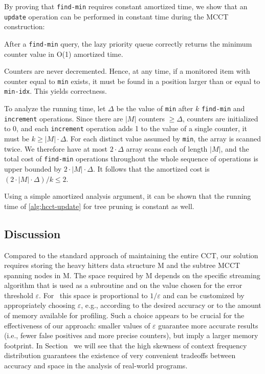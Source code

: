 \ifauthorea{\newline}{}
\noindent By proving that {\tt find-min} requires constant amortized time, we show that an {\tt update} operation can be performed in constant time during the MCCT construction:
\begin{theorem}
After a {\tt find-min} query, the lazy priority queue correctly returns the minimum counter value in O(1) amortized time.
\end{theorem}
\begin{myproof} Counters are never decremented. Hence, at any time, if a monitored item with counter equal to {\tt min} exists, it must be found in a position larger than or equal to {\tt min-idx}. This yields correctness.

To analyze the running time, let $\Delta$ be the value of {\tt min} after $k$ {\tt find-min} and {\tt increment} operations. Since there are $|M|$ counters $\ge\Delta$, counters are initialized to $0$, and each {\tt increment} operation adds 1 to the value of a single counter, it must be $k\ge |M|\cdot\Delta$. For each distinct value assumed by {\tt min}, the array is scanned twice. We therefore have at most $2\cdot\Delta$ array scans each of length $|M|$, and the total cost of {\tt find-min} operations throughout the whole sequence of operations is upper bounded by $2\cdot|M|\cdot\Delta$. It follows that the amortized cost is $(2\cdot|M|\cdot\Delta)/k\leq 2$.
\end{myproof}

\noindent Using a simple amortized analysis argument, it can be shown that the running time of \myalgorithm\ref{alg:hcct-update} for tree pruning is constant as well.


\subsection{Discussion}

Compared to the standard approach of maintaining the entire CCT, our solution requires storing the heavy hitters data structure M and the subtree MCCT spanning nodes in M. The space required by M depends on the specific streaming algorithm that is used as a subroutine and on the value chosen for the error threshold $\varepsilon$. For \spacesaving\, this space is proportional to $1/\varepsilon$ and can be customized by appropriately choosing $\varepsilon$, e.g., according to the desired accuracy or to the amount of memory available for profiling. Such a choice appears to be crucial for the effectiveness of our approach: smaller values of $\varepsilon$ guarantee more accurate results (i.e., fewer false positives and more precise counters), but imply a larger memory footprint. In Section \missing\ we will see that the high skewness of context frequency distribution guarantees the existence of very convenient tradeoffs between accuracy and space in the analysis of real-world programs.


